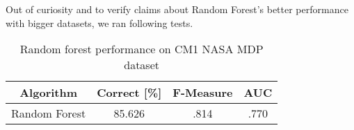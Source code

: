 Out of curiosity and to verify claims about Random Forest's better performance with bigger datasets, we ran following tests.

\begin{table}[h!]
\centering
\begin{tabular}{ |c|c|c|c| }
 \hline
 \textbf{Algorithm} & \textbf{Correct [\%]} & \textbf{F-Measure} & \textbf{AUC}  \\
 \hline
 Random Forest & 85.626 & .814 & .770    \\
 \hline

\end{tabular}
\caption{Random forest performance on CM1 NASA MDP dataset}
\label{table:RF_1}
\end{table}